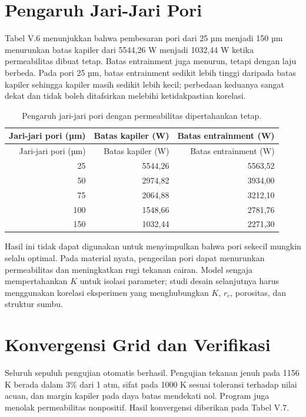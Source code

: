 \documentclass[
  12pt,
  12pt,a4paper,oneside]{report}
\begin{document}
\hypertarget{pengaruh-jari-jari-pori}{%
\section{Pengaruh Jari-Jari Pori}\label{pengaruh-jari-jari-pori}}

Tabel V.6 menunjukkan bahwa pembesaran pori dari 25 µm menjadi 150 µm
menurunkan batas kapiler dari 5544,26 W menjadi 1032,44 W ketika
permeabilitas dibuat tetap. Batas entrainment juga menurun, tetapi
dengan laju berbeda. Pada pori 25 µm, batas entrainment sedikit lebih
tinggi daripada batas kapiler sehingga kapiler masih sedikit lebih
kecil; perbedaan keduanya sangat dekat dan tidak boleh ditafsirkan
melebihi ketidakpastian korelasi.

\begin{longtable}[]{@{}rrr@{}}
\caption{Pengaruh jari-jari pori dengan permeabilitas dipertahankan
tetap.}\tabularnewline
\toprule
Jari-jari pori (µm) & Batas kapiler (W) & Batas entrainment (W) \\
\midrule
\endfirsthead
\toprule
Jari-jari pori (µm) & Batas kapiler (W) & Batas entrainment (W) \\
\midrule
\endhead
25 & 5544,26 & 5563,52 \\
50 & 2974,82 & 3934,00 \\
75 & 2064,88 & 3212,10 \\
100 & 1548,66 & 2781,76 \\
150 & 1032,44 & 2271,30 \\
\bottomrule
\end{longtable}

Hasil ini tidak dapat digunakan untuk menyimpulkan bahwa pori sekecil
mungkin selalu optimal. Pada material nyata, pengecilan pori dapat
menurunkan permeabilitas dan meningkatkan rugi tekanan cairan. Model
sengaja mempertahankan \(K\) untuk isolasi parameter; studi desain
selanjutnya harus menggunakan korelasi eksperimen yang menghubungkan
\(K\), \(r_c\), porositas, dan struktur sumbu.

\hypertarget{konvergensi-grid-dan-verifikasi}{%
\section{Konvergensi Grid dan
Verifikasi}\label{konvergensi-grid-dan-verifikasi}}

Seluruh sepuluh pengujian otomatis berhasil. Pengujian tekanan jenuh
pada 1156 K berada dalam 3\% dari 1 atm, sifat pada 1000 K sesuai
toleransi terhadap nilai acuan, dan margin kapiler pada daya batas
mendekati nol. Program juga menolak permeabilitas nonpositif. Hasil
konvergensi diberikan pada Tabel V.7.
\end{document}
